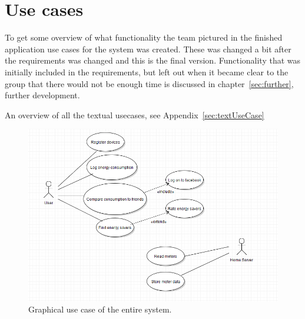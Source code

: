 \section{Use cases}
To get some overview of what functionality the team pictured in the finished application use cases for the system was created. These was changed a bit after the requirements was changed and this is the final version. Functionality that was initially included in the requirements, but left out when it became clear to the group that there would not be enough time is discussed in chapter~\ref{sec:further}, further development.


An overview of all the textual usecases, see Appendix~\ref{sec:textUseCase}


\begin{figure}[H]
\includegraphics[width=\textwidth]{ch/specification/fig/usecase.PNG}
\caption{Graphical use case of the entire system.}
\label{fig:usecase}
\end{figure}

